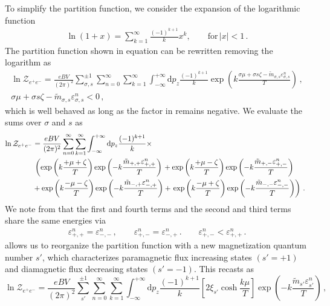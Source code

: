 To simplify the partition function, we consider the expansion of the logarithmic function
\begin{align}
\ln\left(1+x\right)=\sum^{\infty}_{k=1}\frac{(-1)^{k+1}}{k}x^k,\qquad\mathrm{for}\,|x|<1\,.
\end{align}
The partition function shown in equation  can be rewritten removing the logarithm as
\begin{gather}
\label{partitionpower:1}
\ln{\mathcal{Z}_{e^{+}e^{-}}}=\frac{e{B}V}{(2\pi)^{2}}\sum_{\sigma,s}^{\pm1}\sum_{n=0}^{\infty}\sum_{k=1}^{\infty}\int_{-\infty}^{+\infty}\mathrm{d}p_{z}
\frac{(-1)^{k+1}}{k}\exp\left({k\frac{\sigma\mu+\sigma s\zeta-{\tilde m}_{\sigma,s}\varepsilon^{n}_{\sigma,s}}{T}}\right)\,,\\
\label{bapprox} 
\sigma\mu+\sigma s\zeta-{\tilde m}_{\sigma,s}\varepsilon_{\sigma,s}^{n}<0\,,
\end{gather}
which is well behaved as long as the factor in  remains negative. We evaluate the sums over $\sigma$ and $s$ as
\begin{align}
 \label{partitionpower:2}
 \notag\ln{\mathcal{Z}_{e^{+}e^{-}}}&=\frac{e{B}V}{(2\pi)^{2}}\sum_{n=0}^{\infty}\sum_{k=1}^{\infty}\int_{-\infty}^{+\infty}\mathrm{d}p_{z}\frac{(-1)^{k+1}}{k}\times\\
 \notag&\,\left(\exp\left(k\frac{+\mu+\zeta}{T}\right)\exp\left(-k\frac{{\tilde m}_{+,+}\varepsilon_{+,+}^{n}}{T}\right)\right.
 +\exp\left(k\frac{+\mu-\zeta}{T}\right)\exp\left(-k\frac{{\tilde m}_{+,-}\varepsilon_{+,-}^{n}}{T}\right)\qquad\\
 &+\exp\left(k\frac{-\mu-\zeta}{T}\right)\exp\left(-k\frac{{\tilde m}_{-,+}\varepsilon_{-,+}^{n}}{T}\right)
 +\left.\exp\left(k\frac{-\mu+\zeta}{T}\right)\exp\left(-k\frac{{\tilde m}_{-,-}\varepsilon_{-,-}^{n}}{T}\right)\right)\,.
\end{align}
We note from  that the first and fourth terms and the second and third terms share the same energies via
\begin{align}
 \label{partitionpower:3}
 \varepsilon_{+,+}^{n}=\varepsilon_{-,-}^{n}\,,\qquad
 \varepsilon_{+,-}^{n}=\varepsilon_{-,+}^{n}\,.\qquad
 \varepsilon_{+,-}^{n}<\varepsilon_{+,+}^{n}\,.
\end{align}
 allows us to reorganize the partition function with a new magnetization quantum number $s'$, which characterizes paramagnetic flux increasing states $(s'=+1)$ and diamagnetic flux decreasing states $(s'=-1)$. This recasts  as
\begin{equation}
 \label{partitionpower:4}
 \ln{\mathcal{Z}_{e^{+}e^{-}}}=\frac{e{B}V}{(2\pi)^{2}}\sum_{s'}^{\pm1}\sum_{n=0}^{\infty}\sum_{k=1}^{\infty}\int_{-\infty}^{+\infty}\mathrm{d}p_{z}\frac{(-1)^{k+1}}{k} \left[2\xi_{s'}\cosh\frac{k\mu}{T}\right]\exp\left(-k\frac{{\tilde m}_{s'}\varepsilon_{s'}^{n}}{T}\right)\,,
\end{equation}
